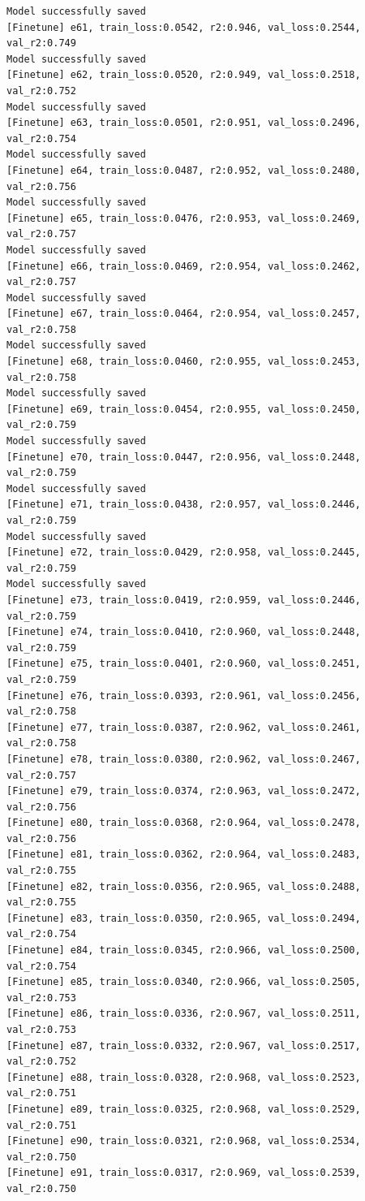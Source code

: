 \documentclass[a4paper, 12pt]{article}
\begin{document}
\begin{lstlisting}
Model successfully saved
[Finetune] e61, train_loss:0.0542, r2:0.946, val_loss:0.2544, val_r2:0.749
Model successfully saved
[Finetune] e62, train_loss:0.0520, r2:0.949, val_loss:0.2518, val_r2:0.752
Model successfully saved
[Finetune] e63, train_loss:0.0501, r2:0.951, val_loss:0.2496, val_r2:0.754
Model successfully saved
[Finetune] e64, train_loss:0.0487, r2:0.952, val_loss:0.2480, val_r2:0.756
Model successfully saved
[Finetune] e65, train_loss:0.0476, r2:0.953, val_loss:0.2469, val_r2:0.757
Model successfully saved
[Finetune] e66, train_loss:0.0469, r2:0.954, val_loss:0.2462, val_r2:0.757
Model successfully saved
[Finetune] e67, train_loss:0.0464, r2:0.954, val_loss:0.2457, val_r2:0.758
Model successfully saved
[Finetune] e68, train_loss:0.0460, r2:0.955, val_loss:0.2453, val_r2:0.758
Model successfully saved
[Finetune] e69, train_loss:0.0454, r2:0.955, val_loss:0.2450, val_r2:0.759
Model successfully saved
[Finetune] e70, train_loss:0.0447, r2:0.956, val_loss:0.2448, val_r2:0.759
Model successfully saved
[Finetune] e71, train_loss:0.0438, r2:0.957, val_loss:0.2446, val_r2:0.759
Model successfully saved
[Finetune] e72, train_loss:0.0429, r2:0.958, val_loss:0.2445, val_r2:0.759
Model successfully saved
[Finetune] e73, train_loss:0.0419, r2:0.959, val_loss:0.2446, val_r2:0.759
[Finetune] e74, train_loss:0.0410, r2:0.960, val_loss:0.2448, val_r2:0.759
[Finetune] e75, train_loss:0.0401, r2:0.960, val_loss:0.2451, val_r2:0.759
[Finetune] e76, train_loss:0.0393, r2:0.961, val_loss:0.2456, val_r2:0.758
[Finetune] e77, train_loss:0.0387, r2:0.962, val_loss:0.2461, val_r2:0.758
[Finetune] e78, train_loss:0.0380, r2:0.962, val_loss:0.2467, val_r2:0.757
[Finetune] e79, train_loss:0.0374, r2:0.963, val_loss:0.2472, val_r2:0.756
[Finetune] e80, train_loss:0.0368, r2:0.964, val_loss:0.2478, val_r2:0.756
[Finetune] e81, train_loss:0.0362, r2:0.964, val_loss:0.2483, val_r2:0.755
[Finetune] e82, train_loss:0.0356, r2:0.965, val_loss:0.2488, val_r2:0.755
[Finetune] e83, train_loss:0.0350, r2:0.965, val_loss:0.2494, val_r2:0.754
[Finetune] e84, train_loss:0.0345, r2:0.966, val_loss:0.2500, val_r2:0.754
[Finetune] e85, train_loss:0.0340, r2:0.966, val_loss:0.2505, val_r2:0.753
[Finetune] e86, train_loss:0.0336, r2:0.967, val_loss:0.2511, val_r2:0.753
[Finetune] e87, train_loss:0.0332, r2:0.967, val_loss:0.2517, val_r2:0.752
[Finetune] e88, train_loss:0.0328, r2:0.968, val_loss:0.2523, val_r2:0.751
[Finetune] e89, train_loss:0.0325, r2:0.968, val_loss:0.2529, val_r2:0.751
[Finetune] e90, train_loss:0.0321, r2:0.968, val_loss:0.2534, val_r2:0.750
[Finetune] e91, train_loss:0.0317, r2:0.969, val_loss:0.2539, val_r2:0.750

\end{lstlisting}
\end{document}
